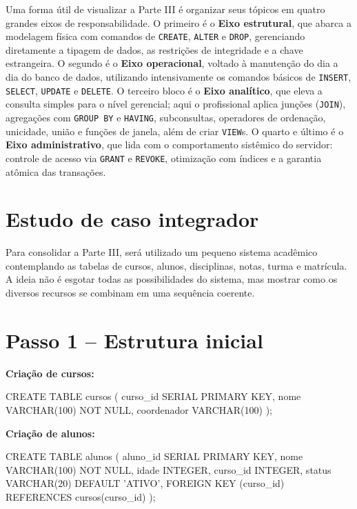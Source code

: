 Uma forma útil de visualizar a Parte III é organizar seus tópicos em quatro grandes eixos de responsabilidade. O primeiro é o \textbf{Eixo estrutural}, que abarca a modelagem física com comandos de \texttt{CREATE}, \texttt{ALTER} e \texttt{DROP}, gerenciando diretamente a tipagem de dados, as restrições de integridade e a chave estrangeira. O segundo é o \textbf{Eixo operacional}, voltado à manutenção do dia a dia do banco de dados, utilizando intensivamente os comandos básicos de \texttt{INSERT}, \texttt{SELECT}, \texttt{UPDATE} e \texttt{DELETE}. O terceiro bloco é o \textbf{Eixo analítico}, que eleva a consulta simples para o nível gerencial; aqui o profissional aplica junções (\texttt{JOIN}), agregações com \texttt{GROUP BY} e \texttt{HAVING}, subconsultas, operadores de ordenação, unicidade, união e funções de janela, além de criar \texttt{VIEW}s. O quarto e último é o \textbf{Eixo administrativo}, que lida com o comportamento sistêmico do servidor: controle de acesso via \texttt{GRANT} e \texttt{REVOKE}, otimização com índices e a garantia atômica das transações.

\section{Estudo de caso integrador}

Para consolidar a Parte III, será utilizado um pequeno sistema acadêmico contemplando as tabelas de cursos, alunos, disciplinas, notas, turma e matrícula. A ideia não é esgotar todas as possibilidades do sistema, mas mostrar como os diversos recursos se combinam em uma sequência coerente.

\section{Passo 1 -- Estrutura inicial}

\textbf{Criação de cursos:}
\begin{sqlcode}
CREATE TABLE cursos (
    curso_id SERIAL PRIMARY KEY,
    nome VARCHAR(100) NOT NULL,
    coordenador VARCHAR(100)
);
\end{sqlcode}

\textbf{Criação de alunos:}
\begin{sqlcode}
CREATE TABLE alunos (
    aluno_id SERIAL PRIMARY KEY,
    nome VARCHAR(100) NOT NULL,
    idade INTEGER,
    curso_id INTEGER,
    status VARCHAR(20) DEFAULT 'ATIVO',
    FOREIGN KEY (curso_id) REFERENCES cursos(curso_id)
);
\end{sqlcode}

